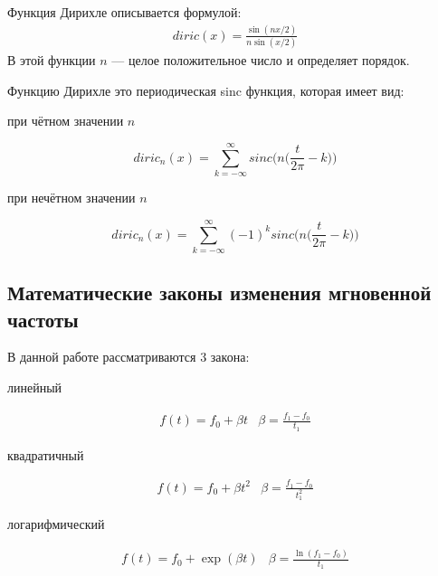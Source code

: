 Функция Дирихле описывается формулой:
\begin{eqnarray}
	diric(x) = \frac{\sin(n x/2)}{n \sin(x/2)}
\end{eqnarray}
В этой функции $n$ --- целое положительное число и определяет порядок.

Функцию Дирихле это периодическая sinc функция, которая имеет вид:
\begin{list}{}{}
\item при чётном значении $n$

\begin{equation}
	diric_n(x) = \sum \limits_{k = -\infty}^{\infty} sinc \bigg( n \bigg( \frac{t}{2\pi} - k \bigg) \bigg)
\end{equation}

\item при нечётном значении $n$

\begin{equation}
	diric_n(x) = \sum \limits_{k = -\infty}^{\infty} (-1)^k sinc \bigg( n \bigg( \frac{t}{2\pi} - k \bigg) \bigg)
\end{equation}
\end{list}


\subsection{Математические законы изменения мгновенной частоты}
В данной работе рассматриваются 3 закона:
\begin{list}{}{}

\item линейный  

\begin{eqnarray}
f(t) = f_0 + \beta t & \beta = \frac{f_1-f_0}{t_1}
\end{eqnarray}

\item квадратичный

\begin{eqnarray}
f(t) = f_0 + \beta t^2 & \beta = \frac{f_1-f_0}{t_1^2}
\end{eqnarray}

\item логарифмический

\begin{eqnarray}
f(t) = f_0 + \exp(\beta t) & \beta = \frac{\ln(f_1-f_0)}{t_1}
\end{eqnarray}

\end{list}

